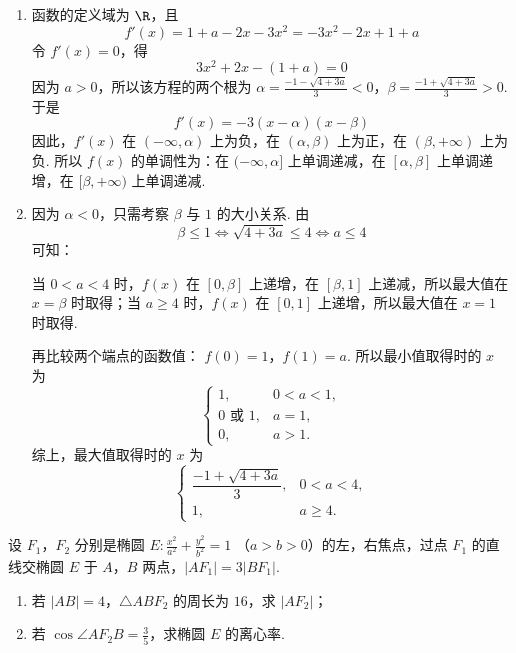 \begin{solution}
\begin{enumerate}
\item 函数的定义域为 \(\R\)，且
\[
f'(x)=1+a-2x-3x^2=-3x^2-2x+1+a
\]
令 \(f'(x)=0\)，得
\[
3x^2+2x-(1+a)=0
\]
因为 \(a>0\)，所以该方程的两个根为
\(\alpha=\frac{-1-\sqrt{4+3a}}{3}<0\)，\(\beta=\frac{-1+\sqrt{4+3a}}{3}>0\).
于是
\[
f'(x)=-3(x-\alpha)(x-\beta)
\]
因此，\(f'(x)\) 在 \((-\infty,\alpha)\) 上为负，在 \((\alpha,\beta)\) 上为正，在 \((\beta,+\infty)\) 上为负. 所以 \(f(x)\) 的单调性为：在 \((-\infty,\alpha]\) 上单调递减，在 \([\alpha,\beta]\) 上单调递增，在 \([\beta,+\infty)\) 上单调递减.

\item 因为 \(\alpha<0\)，只需考察 \(\beta\) 与 \(1\) 的大小关系. 由
\[
\beta\leqslant1\Longleftrightarrow\sqrt{4+3a}\leqslant4\Longleftrightarrow a\leqslant4
\]
可知：

当 \(0<a<4\) 时，\(f(x)\) 在 \([0,\beta]\) 上递增，在 \([\beta,1]\) 上递减，所以最大值在 \(x=\beta\) 时取得；当 \(a\geqslant4\) 时，\(f(x)\) 在 \([0,1]\) 上递增，所以最大值在 \(x=1\) 时取得.

再比较两个端点的函数值：
\(f(0)=1\)，\(f(1)=a\).
所以最小值取得时的 \(x\) 为
\[
\begin{cases}
1, & 0<a<1,\\
0\text{ 或 }1, & a=1,\\
0, & a>1.
\end{cases}
\]
综上，最大值取得时的 \(x\) 为
\[
\begin{cases}
\dfrac{-1+\sqrt{4+3a}}{3}, & 0<a<4,\\
1, & a\geqslant4.
\end{cases}
\]
\end{enumerate}
\end{solution}

\begin{problem}
设 \(F_1\)，\(F_2\) 分别是椭圆 \(E: \frac{x^2}{a^2} + \frac{y^2}{b^2} = 1\) （\(a > b > 0\)）的左，右焦点，过点 \(F_1\) 的直线交椭圆 \(E\) 于 \(A\)，\(B\) 两点，\(\left|AF_1\right| = 3\left|BF_1\right|\).

\begin{enumerate}
\item 若 \(\left|AB\right| = 4\)，\(\triangle ABF_2\) 的周长为 \(16\)，求 \(\left|AF_2\right|\)；
\item 若 \(\cos \angle AF_2B = \frac{3}{5}\)，求椭圆 \(E\) 的离心率.
\end{enumerate}
\end{problem}

